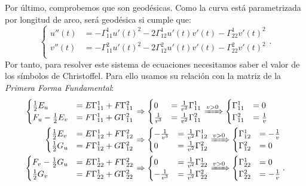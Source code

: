 Por último, comprobemos que son geodésicas. Como la curva está parametrizada por
longitud de arco, será geodésica si cumple que:
\[
\begin{cases}
    u''\left( t \right) &= - \Gamma_{11}^1 u'\left( t \right)^2 - 2 \Gamma_{12}^1
    u'\left( t \right) v'\left( t \right) - \Gamma_{22}^1 v'\left( t \right)^2\\
    v''\left( t \right) &= - \Gamma_{11}^2 u'\left( t \right)^2 - 2 \Gamma_{12}^2
    u'\left( t \right) v'\left( t \right) - \Gamma_{22}^2 v'\left( t \right)^2\\
\end{cases}.
\]
Por tanto, para resolver este sistema de ecuaciones necesitamos saber el valor
de los símbolos de Christoffel. Para ello usamos su relación con la
matriz de la \textit{Primera Forma Fundamental}:
\begin{align*}
    \begin{cases}
        \frac{1}{2} E_u &= E \Gamma_{11}^1 + F \Gamma_{11}^2\\
        F_u - \frac{1}{2} E_v &= F \Gamma_{11}^1 + G \Gamma_{11}^2
    \end{cases} &\Rightarrow \begin{cases}
        0 &= \frac{1}{v^2} \Gamma_{11}^1\\
        \frac{1}{v^3} &= \frac{1}{v^2} \Gamma_{11}^2
        \end{cases} \xRightarrow{v > 0} \begin{cases}
        \Gamma_{11}^1 &= 0\\
        \Gamma_{11}^2 &= \frac{1}{v}
    \end{cases}\\
    \begin{cases}
        \frac{1}{2}E_v &= E \Gamma_{12}^1 + F \Gamma_{12}^2\\
        \frac{1}{2} G_u &= F \Gamma_{12}^1 + G \Gamma_{12}^2
    \end{cases} &\Rightarrow \begin{cases}
        -\frac{1}{v^3} &= \frac{1}{v^2} \Gamma_{12}^1\\
        0 &= \frac{1}{v^2} \Gamma_{12}^2
    \end{cases} \xRightarrow{v > 0} \begin{cases}
        \Gamma_{12}^1 &= -\frac{1}{v}\\
        \Gamma_{12}^2 &= 0
    \end{cases}\\
    \begin{cases}
        F_v - \frac{1}{2} G_u &= E \Gamma_{22}^1 + F \Gamma_{22}^2\\
        \frac{1}{2} G_v &= F \Gamma_{22}^1 + G \Gamma_{22}^2
    \end{cases} &\Rightarrow \begin{cases}
        0 &= \frac{1}{v^2} \Gamma_{22}^1\\
        -\frac{1}{v^3} &= \frac{1}{v^2} \Gamma_{22}^2
        \end{cases} \xRightarrow{v > 0} \begin{cases}
        \Gamma_{22}^1 &= 0\\
        \Gamma_{22}^2 &= -\frac{1}{v}
    \end{cases}.
\end{align*}
